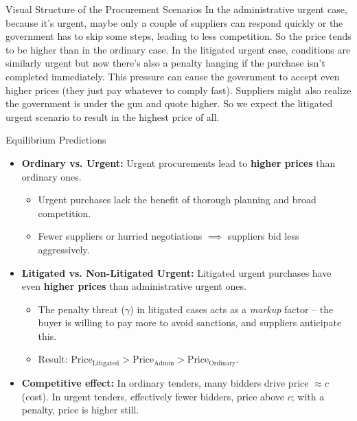 \documentclass[aspectratio=169]{beamer}
\begin{document}
\begin{frame}{Visual Structure of the Procurement Scenarios}
{In the administrative urgent case, because it’s urgent, maybe only a couple of suppliers can respond quickly or the government has to skip some steps, leading to less competition. So the price tends to be higher than in the ordinary case. In the litigated urgent case, conditions are similarly urgent but now there's also a penalty hanging if the purchase isn’t completed immediately. This pressure can cause the government to accept even higher prices (they just pay whatever to comply fast). Suppliers might also realize the government is under the gun and quote higher. So we expect the litigated urgent scenario to result in the highest price of all.}
\end{frame}

\begin{frame}{Equilibrium Predictions}
  \begin{itemize}
    \item \textbf{Ordinary vs. Urgent:} Urgent procurements lead to \textbf{higher prices} than ordinary ones.
          \begin{itemize}
            \item Urgent purchases lack the benefit of thorough planning and broad competition.
            \item Fewer suppliers or hurried negotiations $\implies$ suppliers bid less aggressively.
          \end{itemize}
    \item \textbf{Litigated vs. Non-Litigated Urgent:} Litigated urgent purchases have even \textbf{higher prices} than administrative urgent ones.
          \begin{itemize}
            \item The penalty threat (\(\gamma\)) in litigated cases acts as a \textit{markup} factor – the buyer is willing to pay more to avoid sanctions, and suppliers anticipate this.
            \item Result: \(\text{Price}_{\text{Litigated}} > \text{Price}_{\text{Admin}} > \text{Price}_{\text{Ordinary}}\).
          \end{itemize}
    \item \textbf{Competitive effect:} In ordinary tenders, many bidders drive price $\approx c$ (cost). In urgent tenders, effectively fewer bidders, price above $c$; with a penalty, price is higher still.
  \end{itemize}
\end{frame}
\end{document}
